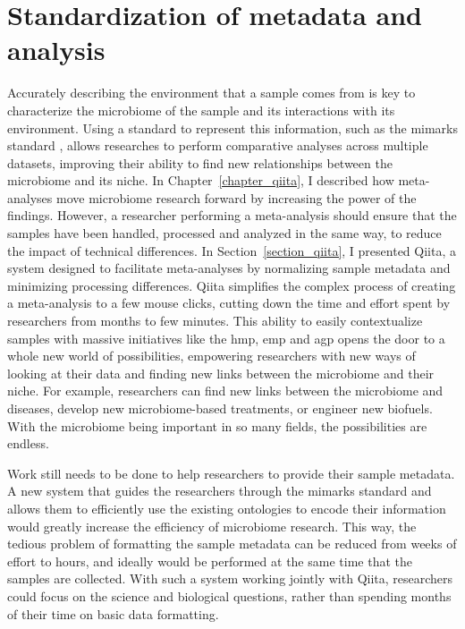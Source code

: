 \section{Standardization of metadata and analysis}

Accurately describing the environment that a sample comes from is key to characterize
the microbiome of the sample and its interactions with its environment. Using a
standard to represent this information, such as the \gls{mimarks} standard \cite{Yilmaz2011},
allows researches to perform comparative analyses across multiple datasets,
improving their ability to find new relationships between the microbiome and its
niche. In Chapter~\ref{chapter_qiita}, I described how meta-analyses move microbiome
research forward by increasing the power of the findings. However, a researcher
performing a meta-analysis should ensure that the samples have been handled,
processed and analyzed in the same way, to reduce the impact of technical
differences. In Section~\ref{section_qiita}, I presented Qiita, a system
designed to facilitate meta-analyses by normalizing sample metadata and minimizing
processing differences. Qiita simplifies the complex process of creating a
meta-analysis to a few mouse clicks, cutting down the time and effort spent by
researchers from months to few minutes. This ability to easily contextualize samples
with massive initiatives like the \gls{hmp}, \gls{emp} and \gls{agp} opens the door
to a whole new world of possibilities, empowering researchers with new ways of
looking at their data and finding new links between the microbiome and their niche.
For example, researchers can find new links between the microbiome and diseases,
develop new microbiome-based treatments, or engineer new biofuels. With the microbiome
being important in so many fields, the possibilities are endless.

Work still needs to be done to help researchers to provide their sample metadata.
A new system that guides the researchers through the \gls{mimarks} standard and
allows them to efficiently use the existing ontologies to encode their
information would greatly increase the efficiency of microbiome research.
This way, the tedious problem of formatting the sample metadata can be reduced
from weeks of effort to hours, and ideally would be performed at the same time
that the samples are collected. With such a system working jointly with Qiita,
researchers could focus on the science and biological questions,
rather than spending months of their time on basic data formatting.

